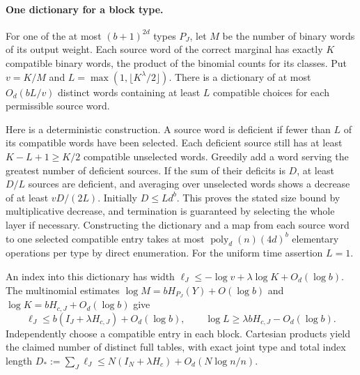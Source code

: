 \paragraph{One dictionary for a block type.}
For one of the at most $(b+1)^{2d}$ types $P_J$, let $M$ be the number of binary words of its output weight. Each source word of the correct marginal has exactly $K$ compatible binary words, the product of the binomial counts for its classes. Put $v=K/M$ and $L=\max(1,\lfloor K^\lambda/2\rfloor)$. There is a dictionary of at most $O_d(bL/v)$ distinct words containing at least $L$ compatible choices for each permissible source word.

Here is a deterministic construction. A source word is deficient if fewer than $L$ of its compatible words have been selected. Each deficient source still has at least $K-L+1\ge K/2$ compatible unselected words. Greedily add a word serving the greatest number of deficient sources. If the sum of their deficits is $D$, at least $D/L$ sources are deficient, and averaging over unselected words shows a decrease of at least $vD/(2L)$. Initially $D\le Ld^b$. This proves the stated size bound by multiplicative decrease, and termination is guaranteed by selecting the whole layer if necessary. Constructing the dictionary and a map from each source word to one selected compatible entry takes at most $\operatorname{poly}_d(n)(4d)^b$ elementary operations per type by direct enumeration. For the uniform time assertion $L=1$.

An index into this dictionary has width $\ell_J\le -\log v+\lambda\log K+O_d(\log b)$. The multinomial estimates $\log M=bH_{P_J}(Y)+O(\log b)$ and $\log K=bH_{c,J}+O_d(\log b)$ give
\[
 \ell_J\le b(I_J+\lambda H_{c,J})+O_d(\log b),
 \qquad \log L\ge\lambda bH_{c,J}-O_d(\log b).
\]
Independently choose a compatible entry in each block. Cartesian products yield the claimed number of distinct full tables, with exact joint type and total index length $D_*:=\sum_J\ell_J\le N(I_N+\lambda H_c)+O_d(N\log n/n)$.

